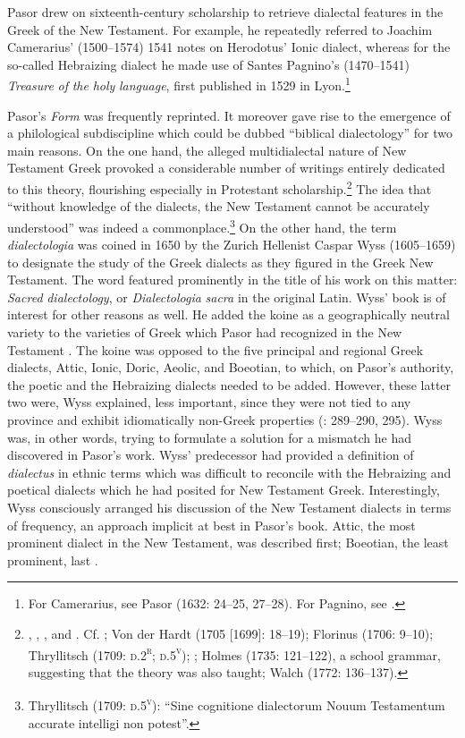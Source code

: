 Pasor drew on sixteenth-century scholarship to retrieve dialectal features in the Greek of the New Testament. For example, he repeatedly referred to Joachim Camerarius’ (1500–1574) 1541 notes on Herodotus’ Ionic dialect, whereas for the so-called Hebraizing dialect he made use of Santes Pagnino’s (1470–1541) \textit{Treasure} \textit{of} \textit{the} \textit{holy} \textit{language}, first published in 1529 in Lyon.\footnote{For Camerarius, see Pasor (1632: 24–25, 27–28). For Pagnino, see \citet[36]{Pasor1632}.}

Pasor’s \textit{Form} was frequently reprinted. It moreover gave rise to the emergence of a philological subdiscipline which could be dubbed “biblical dialectology” for two main reasons. On the one hand, the alleged multidialectal nature of New Testament Greek provoked a considerable number of writings entirely dedicated to this theory, flourishing especially in Protestant scholarship.\footnote{\citet{Wyss1650}, \citet{Olearius1668}, \citet{Leusden1670}, and \citet{Nibbe1755}. Cf. \citet[347]{Parr1686}; Von der Hardt (1705 [1699]: 18–19); Florinus (1706: 9–10); Thryllitsch (1709: \textsc{d.2}\textsc{\textsuperscript{r}}; \textsc{d.5}\textsc{\textsuperscript{v}}); \citet[18]{Reinhard1724}; Holmes (1735: 121–122), a school grammar, suggesting that the theory was also taught; Walch (1772: 136–137).} The idea that “without knowledge of the dialects, the New Testament cannot be accurately understood” was indeed a commonplace.\footnote{Thryllitsch (1709: \textsc{d.5}\textsc{\textsuperscript{v}}): “Sine cognitione dialectorum Nouum Testamentum accurate intelligi non potest”.} On the other hand, the term \textit{dialectologia} was coined in 1650 by the Zurich Hellenist Caspar Wyss (1605–1659) to designate the study of the Greek dialects as they figured in the Greek New Testament. The word featured prominently in the title of his work on this matter: \textit{Sacred} \textit{dialectology}, or \textit{Dialectologia} \textit{sacra} in the original Latin. Wyss’ book is of interest for other reasons as well. He added the koine as a geographically neutral variety to the varieties of Greek which Pasor had recognized in the New Testament \citep[3]{Wyss1650}. The koine was opposed to the five principal and regional Greek dialects, Attic, Ionic, Doric, Aeolic, and Boeotian, to which, on Pasor’s authority, the poetic and the Hebraizing dialects needed to be added. However, these latter two were, Wyss explained, less important, since they were not tied to any province and exhibit idiomatically non-Greek properties (\citealt{Wyss1650}: 289–290, 295). Wyss was, in other words, trying to formulate a solution for a mismatch he had discovered in Pasor’s work. Wyss’ predecessor had provided a definition of \textit{dialectus} in ethnic terms which was difficult to reconcile with the Hebraizing and poetical dialects which he had posited for New Testament Greek. Interestingly, Wyss consciously arranged his discussion of the New Testament dialects in terms of frequency, an approach implicit at best in Pasor’s book. Attic, the most prominent dialect in the New Testament, was described first; Boeotian, the least prominent, last \citep[4]{Wyss1650}.

